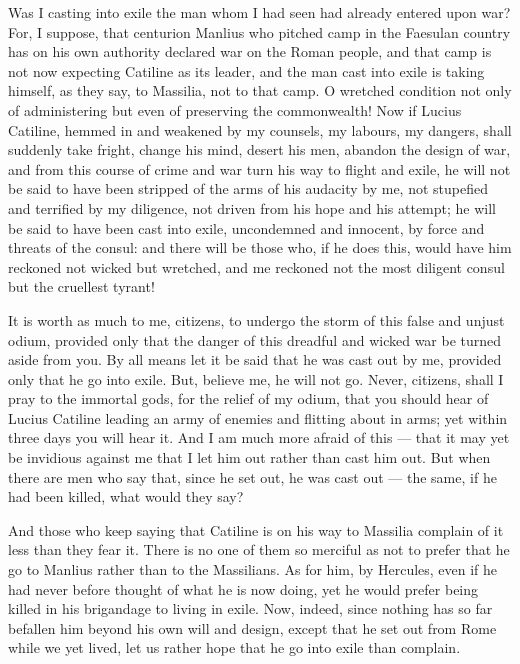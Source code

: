 Was I casting into exile the man whom I had seen had already entered upon war? For, I suppose, that centurion Manlius who pitched camp in the Faesulan country has on his own authority declared war on the Roman people, and that camp is not now expecting Catiline as its leader, and the man cast into exile is taking himself, as they say, to Massilia, not to that camp. O wretched condition not only of administering but even of preserving the commonwealth! Now if Lucius Catiline, hemmed in and weakened by my counsels, my labours, my dangers, shall suddenly take fright, change his mind, desert his men, abandon the design of war, and from this course of crime and war turn his way to flight and exile, he will not be said to have been stripped of the arms of his audacity by me, not stupefied and terrified by my diligence, not driven from his hope and his attempt; he will be said to have been cast into exile, uncondemned and innocent, by force and threats of the consul: and there will be those who, if he does this, would have him reckoned not wicked but wretched, and me reckoned not the most diligent consul but the cruellest tyrant!

 It is worth as much to me, citizens, to undergo the storm of this false and unjust odium, provided only that the danger of this dreadful and wicked war be turned aside from you. By all means let it be said that he was cast out by me, provided only that he go into exile. But, believe me, he will not go. Never, citizens, shall I pray to the immortal gods, for the relief of my odium, that you should hear of Lucius Catiline leading an army of enemies and flitting about in arms; yet within three days you will hear it. And I am much more afraid of this --- that it may yet be invidious against me that I let him out rather than cast him out. But when there are men who say that, since he set out, he was cast out --- the same, if he had been killed, what would they say?

 And those who keep saying that Catiline is on his way to Massilia complain of it less than they fear it. There is no one of them so merciful as not to prefer that he go to Manlius rather than to the Massilians. As for him, by Hercules, even if he had never before thought of what he is now doing, yet he would prefer being killed in his brigandage to living in exile. Now, indeed, since nothing has so far befallen him beyond his own will and design, except that he set out from Rome while we yet lived, let us rather hope that he go into exile than complain.

